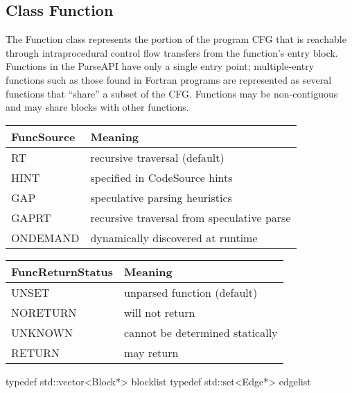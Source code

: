 \subsection{Class Function}


The Function class represents the portion of the program CFG that is reachable through intraprocedural control flow transfers from the function's entry block. Functions in the ParseAPI have only a single entry point; multiple-entry functions such as those found in Fortran programs are represented as several functions that ``share'' a subset of the CFG. Functions may be non-contiguous and may share blocks with other functions. 

\begin{center}
\begin{tabular}{ll}
\toprule
FuncSource & Meaning \\
\midrule
RT & recursive traversal (default) \\
HINT & specified in CodeSource hints \\
GAP & speculative parsing heuristics \\
GAPRT & recursive traversal from speculative parse \\
ONDEMAND & dynamically discovered at runtime \\
\bottomrule
\end{tabular}
\end{center}


\begin{center}
\begin{tabular}{ll}
\toprule
FuncReturnStatus & Meaning \\
\midrule
UNSET & unparsed function (default) \\
NORETURN & will not return \\
UNKNOWN & cannot be determined statically \\
RETURN & may return \\
\bottomrule
\end{tabular}
\end{center}

\begin{apient}
typedef std::vector<Block*> blocklist
typedef std::set<Edge*> edgelist
\end{apient}

